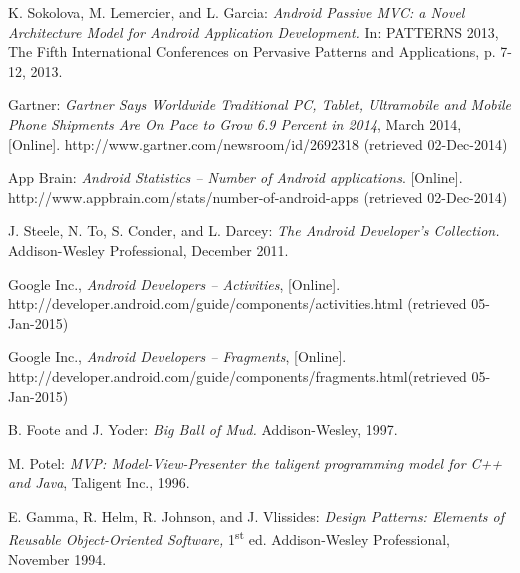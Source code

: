 \begin{thebibliography}{1}

K. Sokolova, M. Lemercier, and L. Garcia: \emph{Android Passive MVC: a Novel Architecture Model for Android Application Development.} In: PATTERNS 2013, The Fifth International Conferences on Pervasive Patterns and Applications, p. 7-12, 2013.

Gartner: \emph{Gartner Says Worldwide Traditional PC, Tablet, Ultramobile and 
Mobile Phone Shipments Are On Pace to Grow 6.9 Percent in 2014}, March 2014, 
[Online]. http://www.gartner.com/newsroom/id/2692318 (retrieved 02-Dec-2014)

App Brain: \emph{Android Statistics -- Number of Android applications}. 
[Online].
http://www.appbrain.com/stats/number-of-android-apps (retrieved 02-Dec-2014)

J. Steele, N. To, S. Conder, and L. Darcey: \emph{The Android Developer's Collection.} Addison-Wesley Professional, December 2011.

Google Inc., \emph{Android Developers -- Activities},
[Online]. http://developer.android.com/guide/components/activities.html (retrieved 05-Jan-2015)

Google Inc., \emph{Android Developers -- Fragments},
[Online]. http://developer.android.com/guide/components/fragments.html(retrieved 05-Jan-2015)

B. Foote and J. Yoder: \emph{Big Ball of Mud.} Addison-Wesley, 1997.

M. Potel: \emph{MVP: Model-View-Presenter the taligent programming model for C++ and Java}, Taligent Inc., 1996.

E. Gamma, R. Helm, R. Johnson, and J. Vlissides: \emph{Design Patterns: Elements of Reusable Object-Oriented Software,} 1\textsuperscript{st} ed. Addison-Wesley Professional, November 1994.




\end{thebibliography}